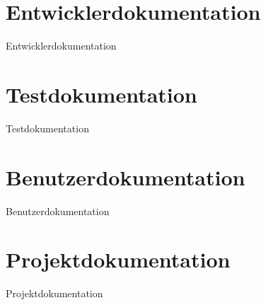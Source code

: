 \documentclass{scrreprt}
\begin{document}
\maketitle
\tableofcontents
\renewcommand{\maketitle}{}
\renewcommand{\tableofcontents}{}

\chapter{Entwicklerdokumentation}
{Entwicklerdokumentation}

\chapter{Testdokumentation}
{Testdokumentation}

\chapter{Benutzerdokumentation}
{Benutzerdokumentation}

\chapter{Projektdokumentation}
{Projektdokumentation}

\end{document}
